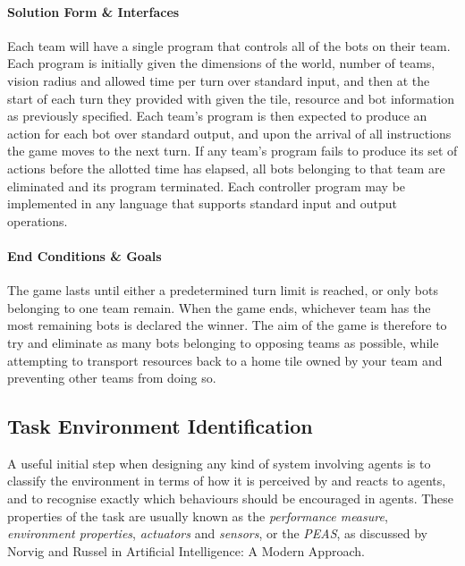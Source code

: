 \documentclass[a4paper,10pt]{article}
\begin{document}
\paragraph{Solution Form \& Interfaces}
Each team will have a single program that controls all of the bots on their team. Each program is initially given the dimensions of the world, number of teams, vision radius and allowed time per turn over standard input, and then at the start of each turn they provided with given the tile, resource and bot information as previously specified. Each team's program is then expected to produce an action for each bot over standard output, and upon the arrival of all instructions the game moves to the next turn. If any team's program fails to produce its set of actions before the allotted time has elapsed, all bots belonging to that team are eliminated and its program terminated. Each controller program may be implemented in any language that supports standard input and output operations.

\paragraph{End Conditions \& Goals}
The game lasts until either a predetermined turn limit is reached, or only bots belonging to one team remain. When the game ends, whichever team has the most remaining bots is declared the winner. The aim of the game is therefore to try and eliminate as many bots belonging to opposing teams as possible, while attempting to transport resources back to a home tile owned by your team and preventing other teams from doing so.

\subsection{Task Environment Identification}
A useful initial step when designing any kind of system involving agents is to classify the environment in terms of how it is perceived by and reacts to agents, and to recognise exactly which behaviours should be encouraged in agents. These properties of the task are usually known as the \emph{performance measure}, \emph{environment properties}, \emph{actuators} and \emph{sensors}, or the \emph{PEAS}, as discussed by Norvig and Russel in Artificial Intelligence: A Modern Approach\cite{norvig10}.
\end{document}
